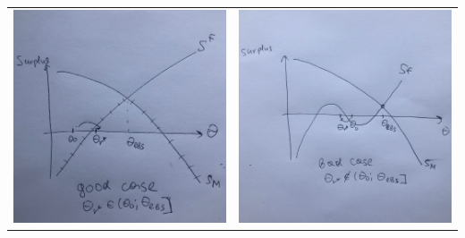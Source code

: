\documentclass[aspectratio=169]{beamer}
\begin{document}
\begin{frame}
\begin{center}
\begin{tabular}{c c}
\includegraphics[scale=0.11]{m_good.jpg} & \includegraphics[scale=0.11]{m_bad.jpg} 
\end{tabular}
\end{center}
\end{frame}
\end{document}
